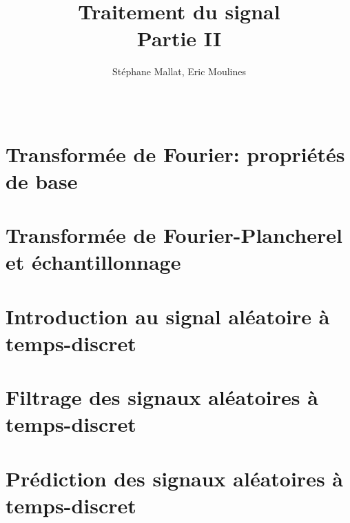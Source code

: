 \documentclass[a4paper,11pt]{book}
\title{Traitement du signal\\
Partie II}
\author{St\'ephane Mallat, Eric Moulines}
\date{\ }
\theoremstyle{break}
\begin{document}
\maketitle
\tableofcontents

\chapter{Transform{\'e}e de Fourier: propri{\'e}t{\'e}s de base}


\chapter{Transform{\'e}e de Fourier-Plancherel et {\'e}chantillonnage}


\chapter{Introduction au signal al\'eatoire \`a temps-discret}


\chapter{Filtrage des signaux al\'eatoires \`a temps-discret}

\chapter{Pr\'ediction des signaux al\'eatoires \`a temps-discret}

%

%



\end{document}

